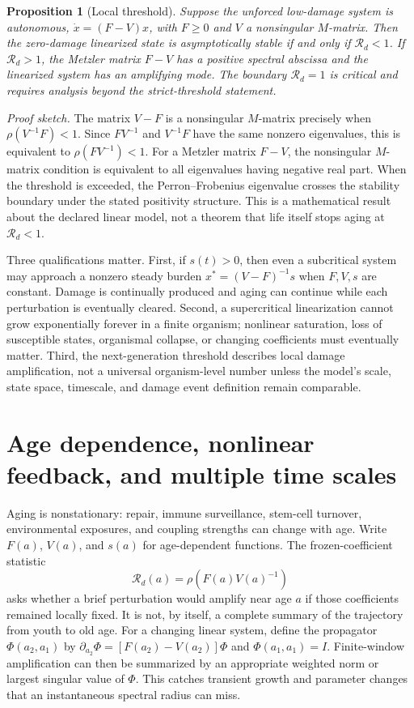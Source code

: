 \documentclass[11pt,a4paper]{article}
\newtheorem{proposition}{Proposition}
\newcommand{\Rd}{\mathcal{R}_{d}}
\newcommand{\rhoop}{\rho}
\begin{document}
\begin{proposition}[Local threshold]
Suppose the unforced low-damage system is autonomous, $\dot{x}=(F-V)x$, with $F\geq0$ and $V$ a nonsingular $M$-matrix. Then the zero-damage linearized state is asymptotically stable if and only if $\Rd<1$. If $\Rd>1$, the Metzler matrix $F-V$ has a positive spectral abscissa and the linearized system has an amplifying mode. The boundary $\Rd=1$ is critical and requires analysis beyond the strict-threshold statement.
\end{proposition}

\textit{Proof sketch.} The matrix $V-F$ is a nonsingular $M$-matrix precisely when $\rhoop(V^{-1}F)<1$. Since $FV^{-1}$ and $V^{-1}F$ have the same nonzero eigenvalues, this is equivalent to $\rhoop(FV^{-1})<1$. For a Metzler matrix $F-V$, the nonsingular $M$-matrix condition is equivalent to all eigenvalues having negative real part. When the threshold is exceeded, the Perron--Frobenius eigenvalue crosses the stability boundary under the stated positivity structure. This is a mathematical result about the declared linear model, not a theorem that life itself stops aging at $\Rd<1$.

Three qualifications matter. First, if $s(t)>0$, then even a subcritical system may approach a nonzero steady burden $x^*=(V-F)^{-1}s$ when $F,V,s$ are constant. Damage is continually produced and aging can continue while each perturbation is eventually cleared. Second, a supercritical linearization cannot grow exponentially forever in a finite organism; nonlinear saturation, loss of susceptible states, organismal collapse, or changing coefficients must eventually matter. Third, the next-generation threshold describes local damage amplification, not a universal organism-level number unless the model's scale, state space, timescale, and damage event definition remain comparable.

\section{Age dependence, nonlinear feedback, and multiple time scales}
Aging is nonstationary: repair, immune surveillance, stem-cell turnover, environmental exposures, and coupling strengths can change with age. Write $F(a)$, $V(a)$, and $s(a)$ for age-dependent functions. The frozen-coefficient statistic
\begin{equation}
\Rd(a)=\rhoop\!\left(F(a)V(a)^{-1}\right)
\label{eq:ageR}
\end{equation}
asks whether a brief perturbation would amplify near age $a$ if those coefficients remained locally fixed. It is not, by itself, a complete summary of the trajectory from youth to old age. For a changing linear system, define the propagator $\Phi(a_2,a_1)$ by $\partial_{a_2}\Phi=[F(a_2)-V(a_2)]\Phi$ and $\Phi(a_1,a_1)=I$. Finite-window amplification can then be summarized by an appropriate weighted norm or largest singular value of $\Phi$. This catches transient growth and parameter changes that an instantaneous spectral radius can miss.
\end{document}
